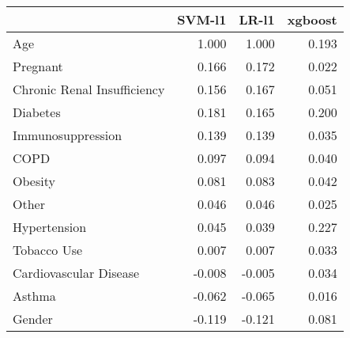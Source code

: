 \begin{tabular}{lrrr}
\toprule
{} &  SVM-l1 &  LR-l1 &  xgboost \\
\midrule
Age                         &   1.000 &  1.000 &    0.193 \\
Pregnant                    &   0.166 &  0.172 &    0.022 \\
Chronic Renal Insufficiency &   0.156 &  0.167 &    0.051 \\
Diabetes                    &   0.181 &  0.165 &    0.200 \\
Immunosuppression           &   0.139 &  0.139 &    0.035 \\
COPD                        &   0.097 &  0.094 &    0.040 \\
Obesity                     &   0.081 &  0.083 &    0.042 \\
Other                       &   0.046 &  0.046 &    0.025 \\
Hypertension                &   0.045 &  0.039 &    0.227 \\
Tobacco Use                 &   0.007 &  0.007 &    0.033 \\
Cardiovascular Disease      &  -0.008 & -0.005 &    0.034 \\
Asthma                      &  -0.062 & -0.065 &    0.016 \\
Gender                      &  -0.119 & -0.121 &    0.081 \\
\bottomrule
\end{tabular}
